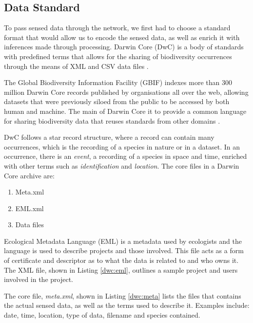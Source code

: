 	\subsection{Data Standard}
		To pass sensed data through the network, we first had to choose a standard format that would allow us to encode the sensed data, as well as enrich it with inferences made through processing. Darwin Core (DwC) is a body of standards with predefined terms that allows for the sharing of biodiversity occurrences through the means of XML and CSV data files \cite{Wieczorek2012b}.

The Global Biodiversity Information Facility (GBIF) indexes more than 300 million Darwin Core records published by organisations all over the web, allowing datasets that were previously siloed from the public to be accessed by both human and machine. The main of Darwin Core it to provide a common language for sharing biodiversity data that reuses standards from other domains \cite{Wieczorek2012a}.

DwC follows a star record structure, where a record can contain many occurrences, which is the recording of a species in nature or in a dataset. In an occurrence, there is an \textit{event}, a recording of a species in space and time, enriched with other terms such as \textit{identification} and \textit{location}. The core files in a Darwin Core archive are:
\begin{enumerate}
	\item Meta.xml
	\item EML.xml
	\item Data files
\end{enumerate}

Ecological Metadata Language (EML) is a metadata used by ecologists and the language is used to describe projects and those involved. This file acts as a form of certificate and descriptor as to what the data is related to and who owns it. The XML file, shown in Listing \ref{dwc:eml}, outlines a sample project and users involved in the project.



The core file, \textit{meta.xml}, shown in Listing \ref{dwc:meta} lists the files that contains the actual sensed data, as well as the terms used to describe it. Examples include: date, time, location, type of data, filename and species contained.

